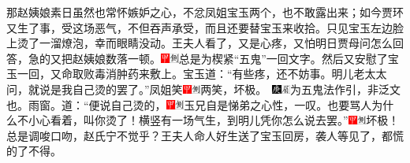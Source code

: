 那赵姨娘素日虽然也常怀嫉妒之心，不忿凤姐宝玉两个，也不敢露出来；如今贾环又生了事，受这场恶气，不但吞声承受，而且还要替宝玉来收拾。只见宝玉左边脸上烫了一溜燎泡，幸而眼睛没动。王夫人看了，又是心疼，又怕明日贾母问怎么回答，急的又把赵姨娘数落一顿。{\includegraphics[width=3mm]{../Images/00002}\includegraphics[width=3mm]{../Images/00011}\footnotesize \kaishu 总是为楔紧``五鬼''一回文字。}然后又安慰了宝玉一回，又命取败毒消肿药来敷上。宝玉道：``有些疼，还不妨事。明儿老太太问，就说是我自己烫的罢了。''凤姐笑{\includegraphics[width=3mm]{../Images/00002}\includegraphics[width=3mm]{../Images/00011}\footnotesize \kaishu 两笑，坏极。　\includegraphics[width=3mm]{../Images/00004}\includegraphics[width=3mm]{../Images/00010}\footnotesize \kaishu 为五鬼法作引，非泛文也。雨窗。}道：``便说自己烫的，{\includegraphics[width=3mm]{../Images/00002}\includegraphics[width=3mm]{../Images/00011}\footnotesize \kaishu 玉兄自是悌弟之心性，一叹。}也要骂人为什么不小心看着，叫你烫了！横竖有一场气生，到明儿凭你怎么说去罢。''{\includegraphics[width=3mm]{../Images/00002}\includegraphics[width=3mm]{../Images/00011}\footnotesize \kaishu 坏极！总是调唆口吻，赵氏宁不觉乎？}王夫人命人好生送了宝玉回房，袭人等见了，都慌的了不得。

